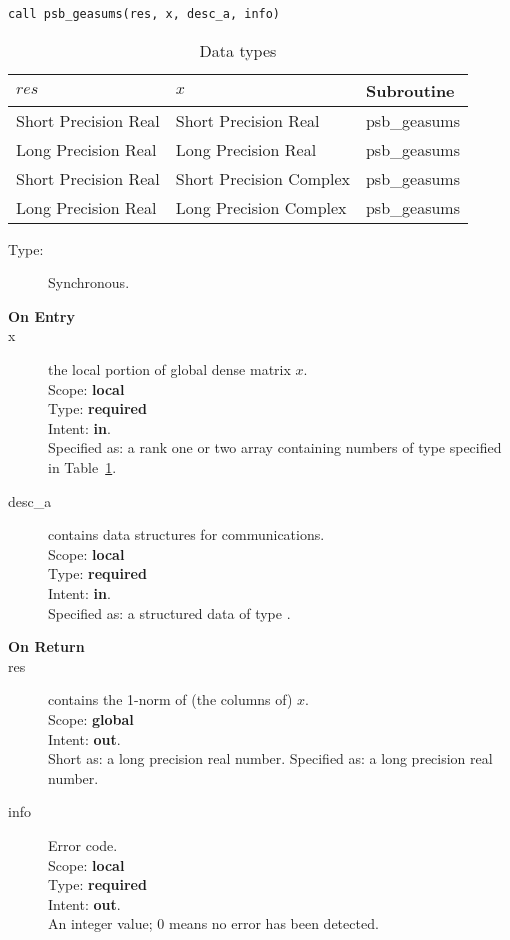 \begin{verbatim}
call psb_geasums(res, x, desc_a, info)
\end{verbatim}

\begin{table}[h]
\begin{center}
\begin{tabular}{lll}
\hline
$res$ & $x$ & {\bf Subroutine}\\
\hline
Short Precision Real&Short Precision Real & psb\_geasums \\
Long Precision Real&Long Precision Real & psb\_geasums \\
Short Precision Real&Short Precision Complex & psb\_geasums \\
Long Precision Real&Long Precision Complex & psb\_geasums \\
\hline
\end{tabular}
\end{center}
\caption{Data types\label{tab:f90asums}}
\end{table}

\begin{description}
\item[Type:] Synchronous.
\item[\bf On Entry]
\item[x] the local portion of global dense matrix
$x$. %
\\
Scope: {\bf local} \\
Type: {\bf required} \\
Intent: {\bf in}.\\
Specified as: a rank one or two array 
containing numbers of type specified in
Table~\ref{tab:f90asums}.
\item[desc\_a] contains data structures for communications.\\
Scope: {\bf local} \\
Type: {\bf required}\\
Intent: {\bf in}.\\
Specified as: a structured data of type \descdata.

\item[\bf On Return] 
\item[res] contains the 1-norm of (the columns of) $x$.\\
Scope: {\bf global} \\
Intent: {\bf out}.\\
Short as: a long precision real  number.
Specified as: a long precision real  number.
\item[info] Error code.\\
Scope: {\bf local} \\
Type: {\bf required} \\
Intent: {\bf out}.\\
An integer value; 0 means no error has been detected. 
\end{description}


